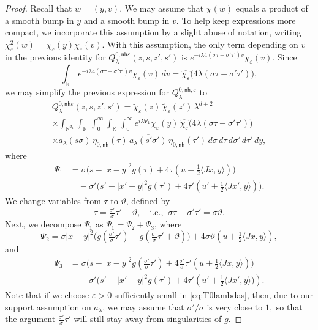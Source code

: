 \documentclass[leqno]{amsart}
\theoremstyle{definition}
\theoremstyle{remark}
\numberwithin{equation}{section}
\newcommand{\R}{\mathbb{R}}
\newcommand\la{{\lambda}}
\newcommand\ve{{\varepsilon}}
\begin{document}
\begin{proof}
Recall that $w=(y,v)$.  We may assume that $\chi(w)$ equals a product of a smooth bump in $y$ and a smooth bump in $v$.  To help keep expressions more compact, we incorporate this assumption by a slight abuse of notation, writing $\chi^2_\ve(w)=\chi_\ve(y)\chi_\ve(v)$. With this assumption, the only term depending on $v$ in the previous identity for $Q^{0,\mathsf{nh}\varepsilon}_\lambda(z,s,z',s')$ is $e^{-i\la 4 (\sigma\tau-\sigma'\tau') v} \chi_\ve(v).$ Since  
\[
\int_{\R} \, e^{-i\la 4 (\sigma\tau-\sigma'\tau') v} \chi_\ve(v)\, dv=\widehat{\chi_\ve}\big(4\la(\sigma\tau-\sigma'\tau')\big),
\] 
we may simplify the previous expression for $ Q^{0,\mathsf{nh},\varepsilon}_\lambda$ to 
\begin{multline*}
 Q^{0,\mathsf{nh}\varepsilon}_\lambda(z,s,z',s') = \tilde \chi_{\varepsilon}(z) \, \tilde\chi_{\varepsilon}(z') \, \lambda^{d + 2} \\
 \times \int_{\R^{d_1}} \int_\R \, \int_0^\infty \int_\R \, \int_0^\infty e^{i\lambda\Psi_1} \chi_{\varepsilon}(y) \,\widehat{\chi_\ve}\big( 4\lambda(\sigma\tau-\sigma'\tau')\big) \\
  \times a_\lambda(s\sigma) \, \eta_{0,\mathsf{nh}}(\tau)  \,\overline{a_\lambda(s'\sigma')} \,\eta_{0,\mathsf{nh}}(\tau')\,  d\sigma \, d\tau \, d\sigma ' \, d\tau'\, d y, \label{eq:Q0-v}
\end{multline*}
where
\begin{align*}
\Psi_1 & = \sigma\big(s-\left|x-y\right|^2g(\tau) + 4 \tau (u + \tfrac12 \langle Jx,y\rangle)\big)\\
&\quad-\sigma'\big(s'-\left|x'-y\right|^2g(\tau') + 4 \tau'(u' + \tfrac12 \langle Jx',y\rangle)\big).
\end{align*}
We change variables from $\tau$ to $\vartheta$, defined by 
$$
\tau = \tfrac{\sigma'}\sigma \tau' + \vartheta, \quad\text{i.e., } \  \sigma\tau-\sigma'\tau' = \sigma\vartheta.
$$
Next, we decompose $\Psi_1$ as $\Psi_1 = \Psi_2 + \Psi_3$,
where
\[
\Psi_2 = \sigma \left|x-y\right|^2\big(g(\tfrac{\sigma'}\sigma \tau')-g(\tfrac{\sigma'}\sigma \tau' + \vartheta)\big) + 
4 \sigma\vartheta (u + \tfrac12\langle J x,y\rangle),
\]
and
\begin{align*}
\Psi_3 & = \sigma\big(s-\left|x-y\right|^2g(\tfrac{\sigma'}\sigma \tau') + 4 \tfrac{\sigma'}{\sigma}\tau'(u + \tfrac12\langle J x,y\rangle)\big)\\
&\quad -\sigma'\big(s'-\left|x'-y\right|^2g(\tau') + 4 \tau'(u' + \tfrac12\langle J x',y\rangle\big)).
\end{align*}
Note that if we choose $\ve>0$ sufficiently small in \eqref{eq:T0lambdas}, then, due to our support assumption on $a_\la$, we may assume that $\sigma'/\sigma$ is very close to $1,$ so that the argument $\tfrac{\sigma'}\sigma \tau'$ will still stay away from singularities of $g$. 


\end{proof}
\end{document}
